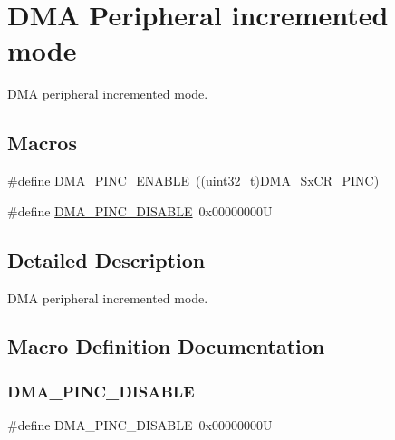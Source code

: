 \hypertarget{group___d_m_a___peripheral__incremented__mode}{}\section{D\+MA Peripheral incremented mode}
\label{group___d_m_a___peripheral__incremented__mode}


D\+MA peripheral incremented mode.  


\subsection*{Macros}
\begin{DoxyCompactItemize}
\item 
\#define \hyperlink{group___d_m_a___peripheral__incremented__mode_gab6d84e5805302516d26c06fb4497a346}{D\+M\+A\+\_\+\+P\+I\+N\+C\+\_\+\+E\+N\+A\+B\+LE}~((uint32\+\_\+t)D\+M\+A\+\_\+\+Sx\+C\+R\+\_\+\+P\+I\+NC)
\item 
\#define \hyperlink{group___d_m_a___peripheral__incremented__mode_ga63e2aff2973d1a8f01d5d7b6e4894f39}{D\+M\+A\+\_\+\+P\+I\+N\+C\+\_\+\+D\+I\+S\+A\+B\+LE}~0x00000000U
\end{DoxyCompactItemize}


\subsection{Detailed Description}
D\+MA peripheral incremented mode. 



\subsection{Macro Definition Documentation}
\mbox{\label{group___d_m_a___peripheral__incremented__mode_ga63e2aff2973d1a8f01d5d7b6e4894f39}} 
\subsubsection{\texorpdfstring{D\+M\+A\+\_\+\+P\+I\+N\+C\+\_\+\+D\+I\+S\+A\+B\+LE}{DMA\_PINC\_DISABLE}}
{\footnotesize\ttfamily \#define D\+M\+A\+\_\+\+P\+I\+N\+C\+\_\+\+D\+I\+S\+A\+B\+LE~0x00000000U}

